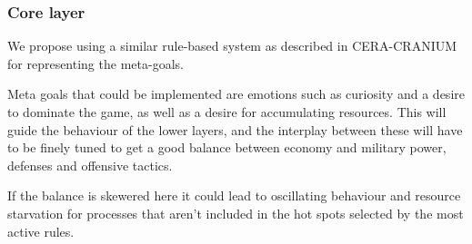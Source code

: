 \subsubsection{Core layer}
We propose using a similar rule-based system as described in CERA-CRANIUM for
representing the meta-goals.

Meta goals that could be implemented are emotions such as curiosity and a
desire to dominate the game, as well as a desire for accumulating resources.
This will guide the behaviour of the lower layers, and the interplay between
these will have to be finely tuned to get a good balance between economy and
military power, defenses and offensive tactics.

If the balance is skewered here it could lead to oscillating behaviour and
resource starvation for processes that aren't included in the hot spots
selected by the most active rules.